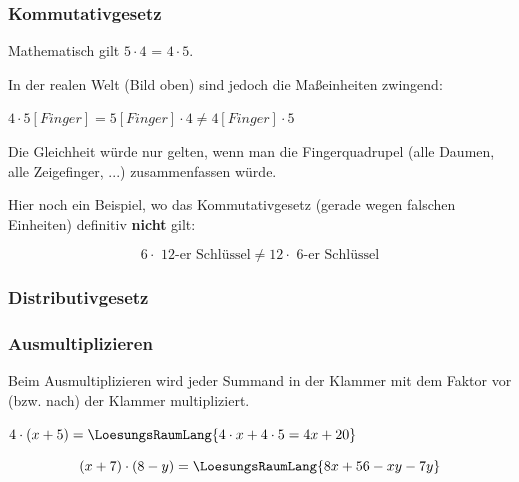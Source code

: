 \subsubsection{Kommutativgesetz}
Mathematisch gilt $5\cdot{}4$ = $4\cdot{}5$.



In der realen Welt (Bild oben) sind jedoch die Maßeinheiten zwingend:

$4 \cdot{} 5 [Finger] = 5 [Finger] \cdot{} 4 \ne 4 [Finger] \cdot{} 5$

Die Gleichheit würde nur gelten, wenn man die Fingerquadrupel (alle
Daumen, alle Zeigefinger, ...) zusammenfassen würde.

Hier noch ein Beispiel, wo das Kommutativgesetz (gerade wegen falschen
Einheiten) definitiv \textbf{nicht} gilt:

$$6 \cdot{} \text{ 12-er Schlüssel}  \ne 12 \cdot{} \text{ 6-er Schlüssel}$$

\newpage

\subsubsection{Distributivgesetz}

\newpage

\subsubsection{Ausmultiplizieren}
Beim Ausmultiplizieren wird jeder Summand in der Klammer mit dem
Faktor vor (bzw. nach) der Klammer multipliziert.
\begin{beispiel}{}{}

  $4\cdot (x + 5) =\LoesungsRaumLang{4\cdot x + 4\cdot 5 = 4x + 20}$
\end{beispiel}

\begin{beispiel}{}{}
\TRAINER{\\}
  $$(x + 7)\cdot(8-y) = \LoesungsRaumLang{8x+56-xy-7y}$$

\end{beispiel}


